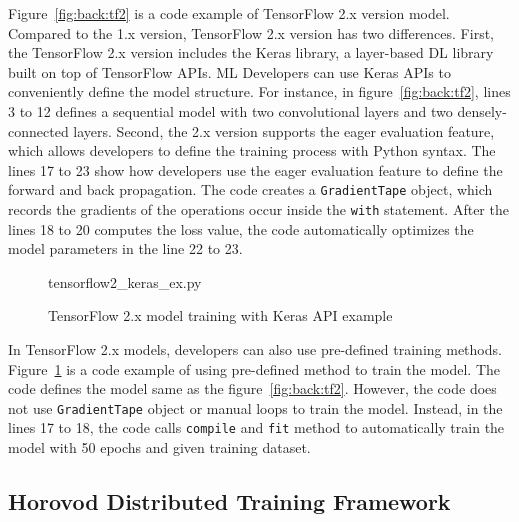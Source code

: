 Figure~\ref{fig:back:tf2} is a code example of TensorFlow 2.x version model.
Compared to the 1.x version, TensorFlow 2.x version has two differences.
First, the TensorFlow 2.x version includes the Keras library, a layer-based
DL library built on top of TensorFlow APIs.
ML Developers can use Keras APIs to conveniently define the model structure.
For instance, in figure~\ref{fig:back:tf2},
lines 3 to 12 defines a sequential model with two convolutional layers and
two densely-connected layers.
Second, the 2.x version supports the eager evaluation feature, which allows
developers to define the training process with Python syntax.
The lines 17 to 23 show how developers use the eager evaluation feature
to define the forward and back propagation. 
The code creates a {\tt GradientTape} object, which records the gradients
of the operations occur inside the {\tt with} statement.
After the lines 18 to 20 computes the loss value,
the code automatically optimizes the model parameters in the line 22 to 23.

\begin{figure}[ht!]

{tensorflow2_keras_ex.py}
  \caption{TensorFlow 2.x model training with Keras API example}
\label{fig:back:tf2_keras}
\end{figure}

In TensorFlow 2.x models, developers can also use pre-defined training
methods. Figure~\ref{fig:back:tf2_keras} is a code example of using
pre-defined method to train the model.
The code defines the model same as the figure~\ref{fig:back:tf2}.
However, the code does not use {\tt GradientTape} object or manual loops to
train the model.
Instead, in the lines 17 to 18, the code calls {\tt compile} and {\tt fit}
method to automatically train the model with 50 epochs and given training
dataset.

\subsection{Horovod Distributed Training Framework}

